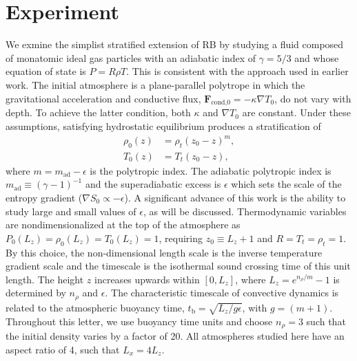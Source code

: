 \documentclass[aps, prl, twocolumn, nofootinbib, groupedaddress, amsfonts, amssymb, amsmath]{revtex4-1}
\newcommand{\grad}{\ensuremath{\nabla}}
\begin{document}
\section{Experiment} 
\label{sec:experiment}
We exmine the simplist stratified extension of RB by studying a
fluid composed of monatomic ideal gas particles with an adiabatic 
index of $\gamma = 5/3$ and whose equation of state is $P = R\rho T$. 
This is consistent with the approach used in earlier work.
The initial atmosphere is a plane-parallel polytrope in which 
the gravitational acceleration and conductive flux, 
$\bm{F}_{\text{cond,0}} = -\kappa \grad T_0$, do not vary with depth. To
achieve the latter condition, both $\kappa$ and $\grad T_0$ are constant.
Under these assumptions, satisfying hydrostatic 
equilibrium produces a stratification of
\begin{equation}
\begin{split}
\rho_0(z) &= \rho_{t}(z_0 - z)^m, \\
T_0(z)    &= T_{t}(z_0 - z),
\label{eqn:polytrope}
\end{split}
\end{equation}
where $m = m_{\text{ad}} - \epsilon$ is the polytropic index.
The adiabatic polytropic index is $m_{\text{ad}} \equiv (\gamma-1)^{-1}$ and
the superadiabatic excess is $\epsilon$ which sets the scale 
of the entropy gradient ($\grad S_0 \propto -\epsilon$).
A significant advance of this work is the ability to study large 
and small values of $\epsilon$, as will be discussed.
Thermodynamic variables are nondimensionalized at the 
top of the atmosphere as  $P_0(L_z) = \rho_0(L_z) = T_0(L_z) = 1$, 
requiring $z_0 \equiv L_z + 1$ and $R = T_{t} = \rho_{t} = 1$.
By this choice, the non-dimensional length scale is the inverse 
temperature gradient scale and the timescale is the isothermal 
sound crossing time of this unit length.
The height $z$ increases upwards within $[0, L_{z}]$, 
where $L_{z} = e^{n_{\rho}/m} - 1$ is
determined by $n_\rho$ and $\epsilon$.
The characteristic timescale of convective dynamics
is related to the atmospheric buoyancy time, 
$t_{\text{b}} = \sqrt{L_z/g\epsilon}$, with $g = (m+1)$.
Throughout this letter, we use buoyancy time units and 
choose $n_{\rho} = 3$ such that the 
initial density varies by a factor of 20.
All atmospheres studied here have an aspect ratio of 4, 
such that $L_x = 4L_z$.
\end{document}
